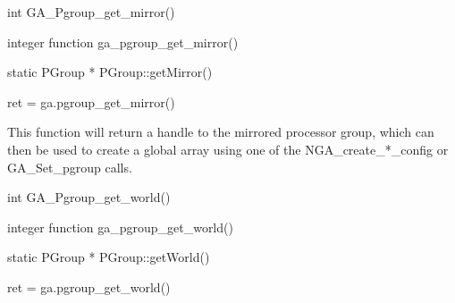 \documentclass[10pt]{article}
\begin{document}

\begin{capi}
\begin{ccode}
int GA_Pgroup_get_mirror()
\end{ccode}
\end{capi}

\begin{fapi}
\begin{fcode}
integer function ga_pgroup_get_mirror()
\end{fcode}
\end{fapi}

\begin{cxxapi}
\begin{cxxcode}
static PGroup * PGroup::getMirror()
\end{cxxcode}
\end{cxxapi}

\begin{pyapi}
\begin{pycode}
ret = ga.pgroup_get_mirror()
\end{pycode}
\end{pyapi}

\local

\begin{desc}
This function will return a handle to the mirrored processor group, which can
then be used to create a global array using one of the NGA_create_*_config or
GA_Set_pgroup calls.
\end{desc}



\begin{capi}
\begin{ccode}
int GA_Pgroup_get_world()
\end{ccode}
\end{capi}

\begin{fapi}
\begin{fcode}
integer function ga_pgroup_get_world()
\end{fcode}
\end{fapi}

\begin{cxxapi}
\begin{cxxcode}
static PGroup * PGroup::getWorld()
\end{cxxcode}
\end{cxxapi}

\begin{pyapi}
\begin{pycode}
ret = ga.pgroup_get_world()
\end{pycode}
\end{pyapi}
\end{document}
